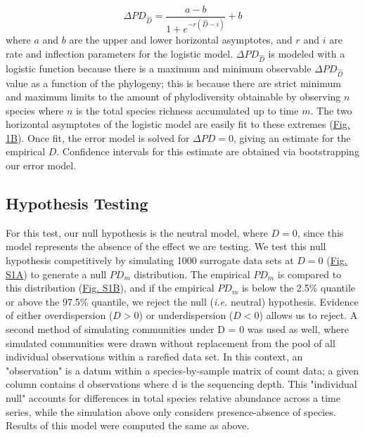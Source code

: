 \documentclass{article}
\begin{document}
\begin{equation}
	\label{sec:equation2}
	\Delta PD_{\hat{D}} = \frac {a-b} { 1 + e^{-r(\hat{D} -i)} } + b 
\end{equation}
where \(a\) and \(b\) are the upper and lower horizontal asymptotes, and \(r\) and \(i\) are rate and inflection parameters for the logistic model. \(\Delta PD_{\hat{D}}\) is modeled with a logistic function because there is a maximum and minimum observable \(\Delta PD_{\hat{D}}\) value as a function of the phylogeny; this is because there are strict minimum and maximum limits to the amount of phylodiversity obtainable by observing \(n\) species where \(n\) is the total species richness accumulated up to time \(m\). The two horizontal asymptotes of the logistic model are easily fit to these extremes (\hyperref[sec:figure1]{Fig. 1B}). Once fit, the error model is solved for \(\Delta PD=0\), giving an estimate for the empirical \(D\). Confidence intervals for this estimate are obtained via bootstrapping our error model.

\subsection{Hypothesis Testing} \label{sec:hypothesisTesting}
For this test, our null hypothesis is the neutral model, where \(D = 0\), since this model represents the absence of the effect we are testing. We test this null hypothesis competitively by simulating 1000 surrogate data sets at \(D = 0\) (\hyperref[sec:figureS1]{Fig. S1A}) to generate a null \(PD_m\) distribution. The empirical \(PD_m\) is compared to this distribution (\hyperref[sec:figureS1]{Fig. S1B}), and if the empirical \(PD_m\) is below the 2.5\% quantile or above the 97.5\% quantile, we reject the null (\emph{i.e.} neutral) hypothesis. Evidence of either overdispersion (\(D > 0\)) or underdispersion (\(D < 0\)) allows us to reject. A second method of simulating communities under D = 0 was used as well, where simulated communities were drawn without replacement from the pool of all individual observations within a rarefied data set. In this context, an "observation" is a datum within a species-by-sample matrix of count data; a given column contains d observations where d is the sequencing depth. This "individual null" accounts for differences in total species relative abundance across a time series, while the simulation above only considers presence-absence of species. Results of this model were computed the same as above. 
\end{document}
